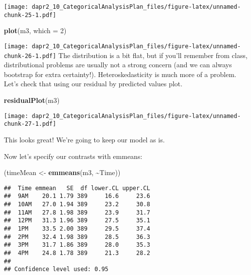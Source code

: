 \documentclass[
]{article}
\newenvironment{Shaded}{\begin{snugshade}}{\end{snugshade}}
\newcommand{\AttributeTok}[1]{\textcolor[rgb]{0.13,0.29,0.53}{#1}}
\newcommand{\DecValTok}[1]{\textcolor[rgb]{0.00,0.00,0.81}{#1}}
\newcommand{\FunctionTok}[1]{\textcolor[rgb]{0.13,0.29,0.53}{\textbf{#1}}}
\newcommand{\NormalTok}[1]{#1}
\newcommand{\OtherTok}[1]{\textcolor[rgb]{0.56,0.35,0.01}{#1}}
\newcommand{\SpecialCharTok}[1]{\textcolor[rgb]{0.81,0.36,0.00}{\textbf{#1}}}
\begin{document}
\begin{Shaded}
\end{Shaded}

\texttt{[image: dapr2\_10\_CategoricalAnalysisPlan\_files/figure-latex/unnamed-chunk-25-1.pdf]}

\begin{Shaded}
\begin{Highlighting}[]
\FunctionTok{plot}\NormalTok{(m3, }\AttributeTok{which =} \DecValTok{2}\NormalTok{)}
\end{Highlighting}
\end{Shaded}

\texttt{[image: dapr2\_10\_CategoricalAnalysisPlan\_files/figure-latex/unnamed-chunk-26-1.pdf]}
The distribution is a bit flat, but if you'll remember from class, distributional problems are usually not a strong concern (and we can always bootstrap for extra certainty!). Heteroskedasticity is much more of a problem. Let's check that using our residual by predicted values plot.

\begin{Shaded}
\begin{Highlighting}[]
\FunctionTok{residualPlot}\NormalTok{(m3)}
\end{Highlighting}
\end{Shaded}

\texttt{[image: dapr2\_10\_CategoricalAnalysisPlan\_files/figure-latex/unnamed-chunk-27-1.pdf]}

This looks great! We're going to keep our model as is.

Now let's specify our contrasts with emmeans:

\begin{Shaded}
\begin{Highlighting}[]
\NormalTok{(timeMean }\OtherTok{\textless{}{-}} \FunctionTok{emmeans}\NormalTok{(m3, }\SpecialCharTok{\textasciitilde{}}\NormalTok{Time))}
\end{Highlighting}
\end{Shaded}

\begin{verbatim}
##  Time emmean   SE  df lower.CL upper.CL
##  9AM    20.1 1.79 389     16.6     23.6
##  10AM   27.0 1.94 389     23.2     30.8
##  11AM   27.8 1.98 389     23.9     31.7
##  12PM   31.3 1.96 389     27.5     35.1
##  1PM    33.5 2.00 389     29.5     37.4
##  2PM    32.4 1.98 389     28.5     36.3
##  3PM    31.7 1.86 389     28.0     35.3
##  4PM    24.8 1.78 389     21.3     28.2
## 
## Confidence level used: 0.95
\end{verbatim}
\end{document}
